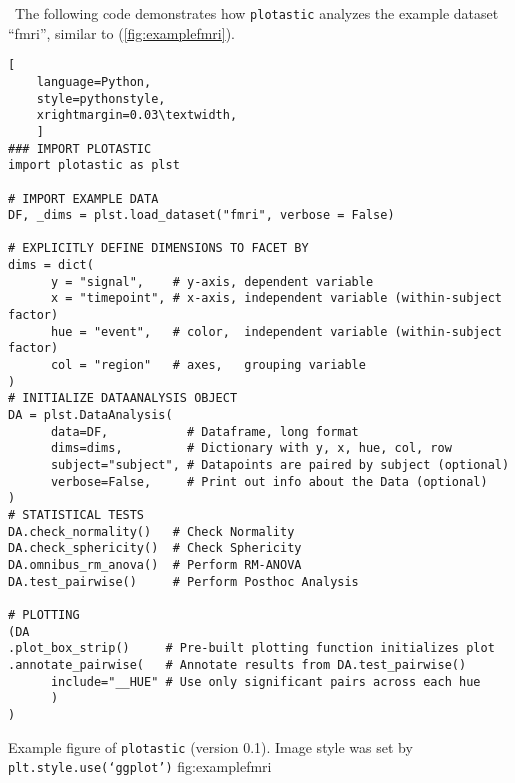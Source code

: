 \
The following code demonstrates how \texttt{plotastic} analyzes the
example dataset ``fmri'', similar to \citet{waskomSeabornStatisticalData2021}
(\autoref{fig:examplefmri}).

\begin{lstlisting}[
    language=Python, 
    style=pythonstyle,
    xrightmargin=0.03\textwidth,
    ]
### IMPORT PLOTASTIC
import plotastic as plst

# IMPORT EXAMPLE DATA
DF, _dims = plst.load_dataset("fmri", verbose = False)

# EXPLICITLY DEFINE DIMENSIONS TO FACET BY
dims = dict(
      y = "signal",    # y-axis, dependent variable
      x = "timepoint", # x-axis, independent variable (within-subject factor)
      hue = "event",   # color,  independent variable (within-subject factor)
      col = "region"   # axes,   grouping variable
)
# INITIALIZE DATAANALYSIS OBJECT
DA = plst.DataAnalysis(
      data=DF,           # Dataframe, long format
      dims=dims,         # Dictionary with y, x, hue, col, row 
      subject="subject", # Datapoints are paired by subject (optional)
      verbose=False,     # Print out info about the Data (optional)
)
# STATISTICAL TESTS
DA.check_normality()   # Check Normality
DA.check_sphericity()  # Check Sphericity
DA.omnibus_rm_anova()  # Perform RM-ANOVA
DA.test_pairwise()     # Perform Posthoc Analysis

# PLOTTING
(DA
.plot_box_strip()     # Pre-built plotting function initializes plot
.annotate_pairwise(   # Annotate results from DA.test_pairwise()
      include="__HUE" # Use only significant pairs across each hue
      ) 
)
\end{lstlisting}



{
      Example figure of \texttt{plotastic} (version 0.1). Image style was set
      by \texttt{plt.style.use(`ggplot')}
}
{fig:examplefmri}



